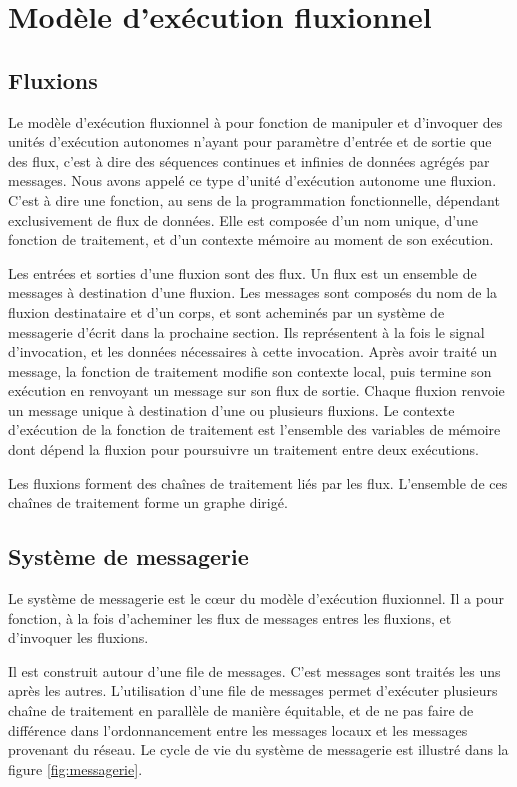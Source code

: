 \section{Modèle d'exécution fluxionnel}

\subsection{Fluxions}

Le modèle d'exécution fluxionnel à pour fonction de manipuler et d'invoquer des unités d'exécution autonomes n'ayant pour paramètre d'entrée et de sortie que des flux, c'est à dire des séquences continues et infinies de données agrégés par messages.
Nous avons appelé ce type d'unité d'exécution autonome une fluxion.
C'est à dire une fonction, au sens de la programmation fonctionnelle, dépendant exclusivement de flux de données.
Elle est composée d'un nom unique, d'une fonction de traitement, et d'un contexte mémoire au moment de son exécution.

Les entrées et sorties d'une fluxion sont des flux.
Un flux est un ensemble de messages à destination d'une fluxion.
Les messages sont composés du nom de la fluxion destinataire et d'un corps, et sont acheminés par un système de messagerie d'écrit dans la prochaine section.
Ils représentent à la fois le signal d'invocation, et les données nécessaires à cette invocation.
Après avoir traité un message, la fonction de traitement modifie son contexte local, puis termine son exécution en renvoyant un message sur son flux de sortie.
Chaque fluxion renvoie un message unique à destination d'une ou plusieurs fluxions.
Le contexte d'exécution de la fonction de traitement est l'ensemble des variables de mémoire dont dépend la fluxion pour poursuivre un traitement entre deux exécutions.

Les fluxions forment des chaînes de traitement liés par les flux.
L'ensemble de ces chaînes de traitement forme un graphe dirigé.

\subsection{Système de messagerie}

Le système de messagerie est le cœur du modèle d'exécution fluxionnel.
Il a pour fonction, à la fois d'acheminer les flux de messages entres les fluxions, et d'invoquer les fluxions.

Il est construit autour d'une file de messages.
C'est messages sont traités les uns après les autres.
L'utilisation d'une file de messages permet d'exécuter plusieurs chaîne de traitement en parallèle de manière équitable, et de ne pas faire de différence dans l'ordonnancement entre les messages locaux et les messages provenant du réseau.
Le cycle de vie du système de messagerie est illustré dans la figure \ref{fig:messagerie}.

